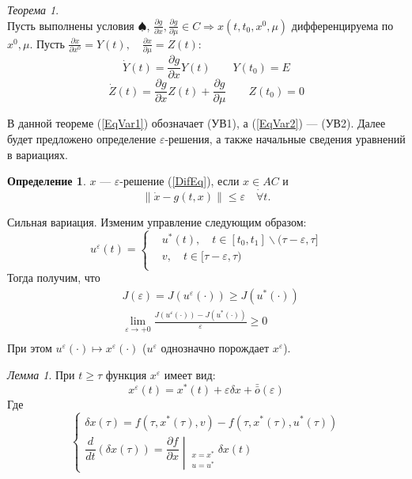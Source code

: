 \documentclass[oneside, final, 14pt, draft]{article}
\theoremstyle{definition}
\theoremstyle{definition}
\newtheorem{defin}{Определение}[section]
\theoremstyle{remark}
\theoremstyle{theorem}
\newtheorem{thm}{Теорема}[section]
\newtheorem{lem}{Лемма}[section]
\renewcommand{\epsilon}{\varepsilon}
\renewcommand{\leq}{\leqslant}
\renewcommand{\geq}{\geqslant}
\begin{document}
\begin{thm} \ \\
Пусть выполнены условия $\spadesuit$, $\frac{\partial g}{\partial x}, \frac{\partial g}{\partial \mu} \in C \Rightarrow x(t, t_0, x^0, \mu)$ дифференцируема по $x^0, \mu$.
Пусть $\frac{\partial x}{\partial x^0} = Y(t), \quad \frac{\partial x}{\partial \mu} = Z(t):$
\begin{equation}
\dot{Y}(t)  = \frac{\partial g}{\partial x} Y(t) \qquad Y(t_0) = E 
\label{EqVar1}
\end{equation}
\begin{equation}
\dot{Z}(t)  = \frac{\partial g}{\partial x} Z(t) +  \frac{\partial g}{\partial \mu}  \qquad Z(t_0) = 0
\label{EqVar2}
\end{equation}
\end{thm}
{\flushleft В данной теореме (\ref{EqVar1}) обозначает (УВ1), а (\ref{EqVar2}) --- (УВ2).
Далее будет предложено определение $\epsilon$-решения, а также начальные сведения уравнений в вариациях.}
\begin{defin}
$x$ --- $\epsilon$-решение (\ref{DifEq}), если $x \in AC$ и 
$$
\| \dot{x} - g(t, x) \| \leq \epsilon \quad \dot{\forall} t.
$$
\end{defin}
Сильная вариация. Изменим управление следующим образом:\\
$$
u^{\epsilon}(t) = 
\left\{ 
\begin{aligned}
& u^*(t), \quad t \in \left[t_0, t_1\right]\backslash (\tau-\epsilon, \tau]\\
& v, \quad t \in  [\tau-\epsilon, \tau)\\
\end{aligned}
\right.
$$
Тогда получим, что
\begin{align*}
&J(\epsilon) = J(u^{\epsilon}(\cdot)) \geq J(u^{*}(\cdot))\\
&\lim\limits_{\epsilon \rightarrow +0} \frac{J(u^{\epsilon}(\cdot)) -J(u^{*}(\cdot))}{\epsilon} \geq 0\\
\end{align*}
При этом $u^{\epsilon}(\cdot) \mapsto x^{\epsilon}(\cdot)$ ($u^{\varepsilon}$ однозначно порождает $x^{\varepsilon}$).

\begin{lem} При $t \geq \tau$ функция $x^{\varepsilon}$ имеет вид:
$$x^{\epsilon}(t) = x^{*}(t) + \epsilon \delta x + \bar{\bar{o}}(\epsilon)$$
Где
\begin{equation*}
\begin{cases}
\delta x(\tau) = f(\tau, x^*(\tau), v) - f(\tau, x^*(\tau), u^*(\tau))\\
\dfrac{d}{dt} (\delta x(\tau)) = \left. \dfrac{\partial f}{\partial x}\middle|_{\substack{x = x^* \\ u = u^*}} \delta x(t)\right.
\end{cases}
\end{equation*}
\end{lem}
\end{document}
